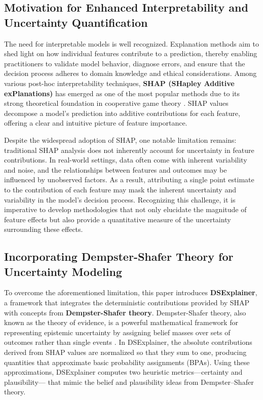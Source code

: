 \documentclass[acmlarge]{acmart}
\begin{document}
\subsection{Motivation for Enhanced Interpretability and Uncertainty Quantification}
The need for interpretable models is well recognized. Explanation methods aim to shed light on how individual features contribute to a prediction, thereby enabling practitioners to validate model behavior, diagnose errors, and ensure that the decision process adheres to domain knowledge and ethical considerations. Among various post-hoc interpretability techniques, \textbf{SHAP (SHapley Additive exPlanations)} has emerged as one of the most popular methods due to its strong theoretical foundation in cooperative game theory \cite{lundberg2017unified}. SHAP values decompose a model's prediction into additive contributions for each feature, offering a clear and intuitive picture of feature importance.

Despite the widespread adoption of SHAP, one notable limitation remains: traditional SHAP analysis does not inherently account for uncertainty in feature contributions. In real-world settings, data often come with inherent variability and noise, and the relationships between features and outcomes may be influenced by unobserved factors. As a result, attributing a single point estimate to the contribution of each feature may mask the inherent uncertainty and variability in the model's decision process. Recognizing this challenge, it is imperative to develop methodologies that not only elucidate the magnitude of feature effects but also provide a quantitative measure of the uncertainty surrounding these effects.

\subsection{Incorporating Dempster-Shafer Theory for Uncertainty Modeling}
To overcome the aforementioned limitation, this paper introduces \textbf{DSExplainer}, a framework that integrates the deterministic contributions provided by SHAP with concepts from \textbf{Dempster-Shafer theory}. Dempster-Shafer theory, also known as the theory of evidence, is a powerful mathematical framework for representing epistemic uncertainty by assigning belief masses over sets of outcomes rather than single events \cite{shafer1976mathematical}. In DSExplainer, the absolute contributions derived from SHAP values are normalized so that they sum to one, producing quantities that approximate basic probability assignments (BPAs). Using these approximations, DSExplainer computes two heuristic metrics—certainty and plausibility— that mimic the belief and plausibility ideas from Dempster--Shafer theory.
\end{document}
